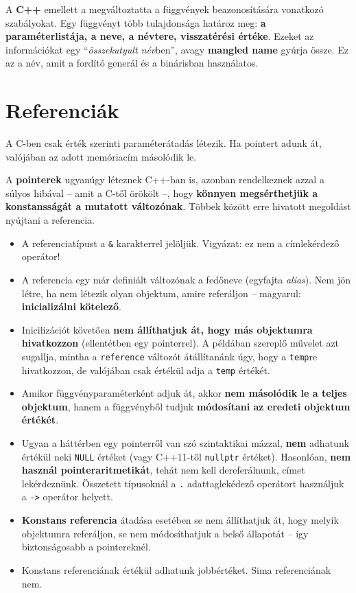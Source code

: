 \documentclass[a4paper, 11pt, oneside]{book}
\begin{document}
A \textbf{C++} emellett a megváltoztatta a függvények beazonosítására vonatkozó szabályokat. Egy függvényt több tulajdonsága határoz meg: \textbf{a paraméterlistája, a neve, a névtere, visszatérési értéke}. Ezeket az információkat egy ``\textit{összekutyult név}ben'', avagy \textbf{mangled name} gyúrja össze. Ez az a név, amit a fordító generál és a binárisban használatos.

\section{Referenciák}

A C-ben csak érték szerinti paraméterátadás létezik. Ha pointert adunk át, valójában az adott memóriacím másolódik le.

A \textbf{pointerek} ugyanúgy léteznek C++-ban is, azonban rendelkeznek azzal a súlyos hibával -- amit a C-től örökölt --, hogy \textbf{könnyen megsérthetjük a konstansságát a mutatott változónak}. Többek között erre hivatott megoldást nyújtani a referencia.

\begin{itemize}
	\item A referenciatípust a \verb*|&| karakterrel jelöljük. Vigyázat: ez nem a címlekérdező operátor!
	
	\item A referencia egy már definiált változónak a fedőneve (egyfajta \textit{alias}). Nem jön létre, ha nem létezik olyan objektum, amire referáljon -- magyarul: \textbf{inicializálni kötelező}.
	
	\item Inicilizációt követően \textbf{nem állíthatjuk át, hogy más objektumra hivatkozzon} (ellentétben egy pointerrel). A példában szereplő művelet azt sugallja, mintha a \verb*|reference| változót átállítanánk úgy, hogy a \verb*|temp|re hivatkozzon, de valójában csak értékül adja a \verb*|temp| értékét.
	
	\item Amikor függvényparaméterként adjuk át, akkor \textbf{nem másolódik le a teljes objektum}, hanem a függvényből tudjuk \textbf{módosítani az eredeti objektum értékét}.
	
	\item Ugyan a háttérben egy pointerről van szó szintaktikai mázzal, \textbf{nem} adhatunk értékül neki \verb*|NULL| értéket (vagy C++11-től \verb|nullptr| értéket). Hasonlóan, \textbf{nem használ pointeraritmetikát}, tehát nem kell dereferálnunk, címet lekérdeznünk. Összetett típusoknál a \verb*|.| adattaglekédező operátort használjuk a \verb*|->| operátor helyett.
	
	\item \textbf{Konstans referencia} átadása esetében se nem állíthatjuk át, hogy melyik objektumra referáljon, se nem módosíthatjuk a belső állapotát -- így biztonságosabb a pointereknél.
	
	\item Konstans referenciának értékül adhatunk jobbértéket. Sima referenciának nem.
\end{itemize}
\end{document}
